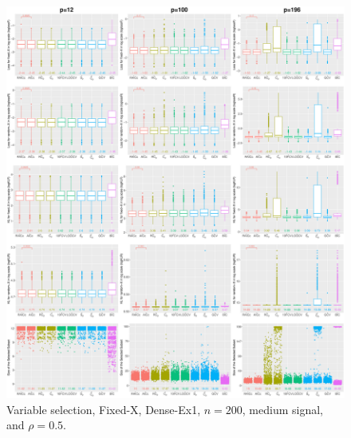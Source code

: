 \begin{figure}[!ht]
\centering
\includegraphics[width=\textwidth]{figures/supplement/fixedx/subset_selection/Dense-Ex1_n200_msnr_rho05.eps}
\caption{Variable selection, Fixed-X, Dense-Ex1, $n=200$, medium signal, and $\rho=0.5$.}
\end{figure}
\clearpage
